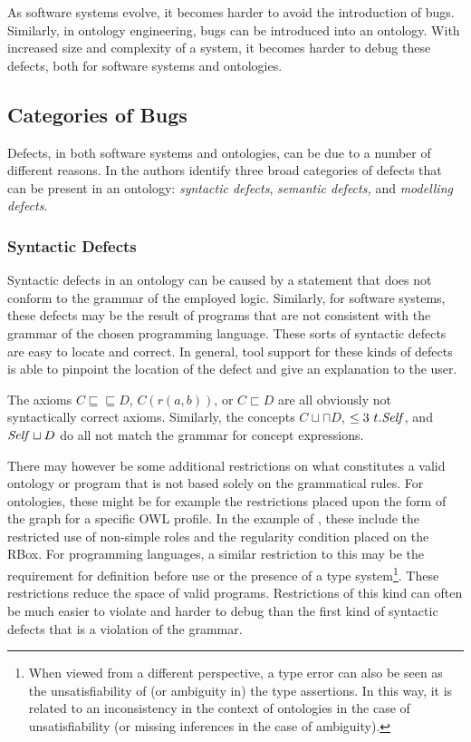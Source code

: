 
As software systems evolve, it becomes harder to avoid the introduction of bugs. Similarly, in ontology engineering, bugs can be introduced into an ontology. With increased size and complexity of a system, it becomes harder to debug these defects, both for software systems and ontologies.

\subsection{Categories of Bugs} \label{categories-of-bugs}

Defects, in both software systems and ontologies, can be due to a number of different reasons. In \cite{kalyanpur2005debugging} the authors identify three broad categories of defects that can be present in an ontology: \emph{syntactic defects}, \emph{semantic defects,} and \emph{modelling defects}.

\subsubsection{Syntactic Defects} \label{syntactic-defects}

Syntactic defects in an ontology can be caused by a statement that does not conform to the grammar of the employed logic. Similarly, for software systems, these defects may be the result of programs that are not consistent with the grammar of the chosen programming language. These sorts of syntactic defects are easy to locate and correct. In general, tool support for these kinds of defects is able to pinpoint the location of the defect and give an explanation to the user.

\begin{example}
The axioms $C \sqsubseteq \sqsubseteq D$, $C(r(a, b))$, or $C \sqsubset D$ are all obviously not syntactically correct \SROIQ axioms. Similarly, the concepts $C \sqcup \sqcap D$, $\leq 3~t.\mathit{Self}$, and $\mathit{Self} \sqcup D$ do all not match the grammar for concept expressions.
\end{example}

There may however be some additional restrictions on what constitutes a valid ontology or program that is not based solely on the grammatical rules. For ontologies, these might be for example the restrictions placed upon the form of the graph for a specific OWL profile. In the example of \SROIQ, these include the restricted use of non-simple roles and the regularity condition placed on the RBox. For programming languages, a similar restriction to this may be the requirement for definition before use or the presence of a type system\footnote{When viewed from a different perspective, a type error can also be seen as the unsatisfiability of (or ambiguity in) the type assertions. In this way, it is related to an inconsistency in the context of ontologies in the case of unsatisfiability (or missing inferences in the case of ambiguity).}. These restrictions reduce the space of valid programs. Restrictions of this kind can often be much easier to violate and harder to debug than the first kind of syntactic defects that is a violation of the grammar.

